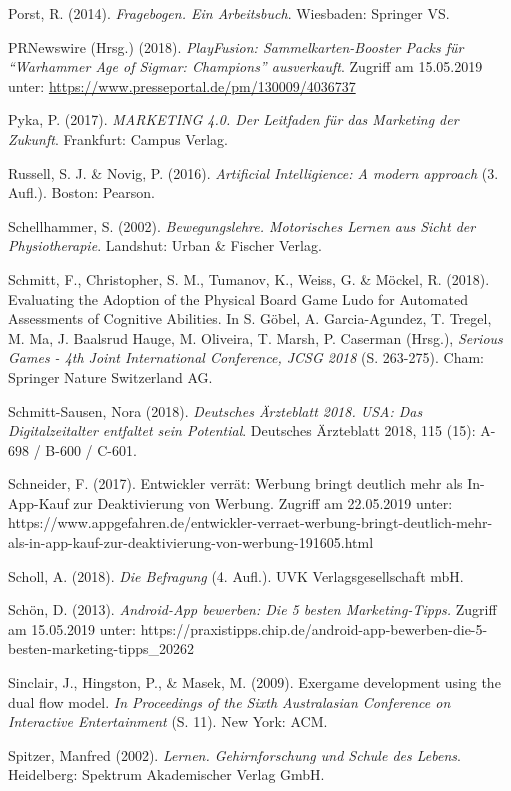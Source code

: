 \documentclass[
  a4paper,
  DIV=11,
  numbers=noendperiod,
  onecolumn,
  oneside,
  a4paper]{scrartcl}
\begin{document}
Porst, R. (2014). \emph{Fragebogen. Ein Arbeitsbuch}. Wiesbaden:
Springer VS.

PRNewswire (Hrsg.) (2018). \emph{PlayFusion: Sammelkarten-Booster Packs
für ``Warhammer Age of Sigmar: Champions'' ausverkauft}. Zugriff am
15.05.2019 unter: \url{https://www.presseportal.de/pm/130009/4036737}

Pyka, P. (2017). \emph{MARKETING 4.0. Der Leitfaden für das Marketing
der Zukunft}. Frankfurt: Campus Verlag.

Russell, S. J. \& Novig, P. (2016). \emph{Artificial Intelligience: A
modern approach} (3. Aufl.). Boston: Pearson.

Schellhammer, S. (2002). \emph{Bewegungslehre. Motorisches Lernen aus
Sicht der Physiotherapie}. Landshut: Urban \& Fischer Verlag.

Schmitt, F., Christopher, S. M., Tumanov, K., Weiss, G. \& Möckel, R.
(2018). Evaluating the Adoption of the Physical Board Game Ludo for
Automated Assessments of Cognitive Abilities. In S. Göbel, A.
Garcia-Agundez, T. Tregel, M. Ma, J. Baalsrud Hauge, M. Oliveira, T.
Marsh, P. Caserman (Hrsg.), \emph{Serious Games - 4th Joint
International Conference, JCSG 2018 }(S. 263-275). Cham: Springer Nature
Switzerland AG.

Schmitt-Sausen, Nora (2018). \emph{Deutsches Ärzteblatt 2018. USA: Das
Digitalzeitalter entfaltet sein Potential}. Deutsches Ärzteblatt 2018,
115 (15): A-698 / B-600 / C-601.

Schneider, F. (2017). Entwickler verrät: Werbung bringt deutlich mehr
als In-App-Kauf zur Deaktivierung von Werbung. Zugriff am 22.05.2019
unter:
https://www.appgefahren.de/entwickler-verraet-werbung-bringt-deutlich-mehr-als-in-app-kauf-zur-deaktivierung-von-werbung-191605.html

Scholl, A. (2018). \emph{Die Befragung }(4. Aufl.). UVK
Verlagsgesellschaft mbH.

Schön, D. (2013). \emph{Android-App bewerben: Die 5 besten
Marketing-Tipps.} Zugriff am 15.05.2019 unter:
https://praxistipps.chip.de/android-app-bewerben-die-5-besten-marketing-tipps\_20262

Sinclair, J., Hingston, P., \& Masek, M. (2009). Exergame development
using the dual flow model. \emph{In Proceedings of the Sixth
Australasian Conference on Interactive Entertainment} (S. 11). New York:
ACM.

Spitzer, Manfred (2002). \emph{Lernen. Gehirnforschung und Schule des
Lebens}. Heidelberg: Spektrum Akademischer Verlag GmbH.
\end{document}
